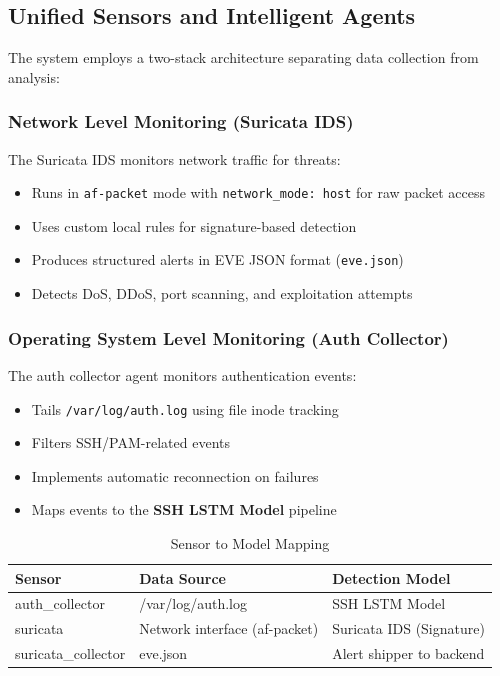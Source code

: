 \documentclass[12pt,a4paper]{report} %
\begin{document}
\subsection{Unified Sensors and Intelligent Agents}
The system employs a two-stack architecture separating data collection from analysis:

\subsubsection{Network Level Monitoring (Suricata IDS)}
The Suricata IDS monitors network traffic for threats:
\begin{itemize}
	\item Runs in \texttt{af-packet} mode with \texttt{network\_mode: host} for raw packet access
	\item Uses custom local rules for signature-based detection
	\item Produces structured alerts in EVE JSON format (\texttt{eve.json})
	\item Detects DoS, DDoS, port scanning, and exploitation attempts
\end{itemize}

\subsubsection{Operating System Level Monitoring (Auth Collector)}
The auth collector agent monitors authentication events:
\begin{itemize}
	\item Tails \texttt{/var/log/auth.log} using file inode tracking
	\item Filters SSH/PAM-related events
	\item Implements automatic reconnection on failures
	\item Maps events to the \textbf{SSH LSTM Model} pipeline
\end{itemize}

\begin{table}[H]
	\centering
	\caption{Sensor to Model Mapping}
	\label{tab:sensor-model}
	\begin{tabular}{|l|l|l|}
		\hline
		\textbf{Sensor} & \textbf{Data Source} & \textbf{Detection Model} \\
		\hline
		auth\_collector & /var/log/auth.log & SSH LSTM Model \\
		suricata & Network interface (af-packet) & Suricata IDS (Signature) \\
		suricata\_collector & eve.json & Alert shipper to backend \\
		\hline
	\end{tabular}
\end{table}
\end{document}
